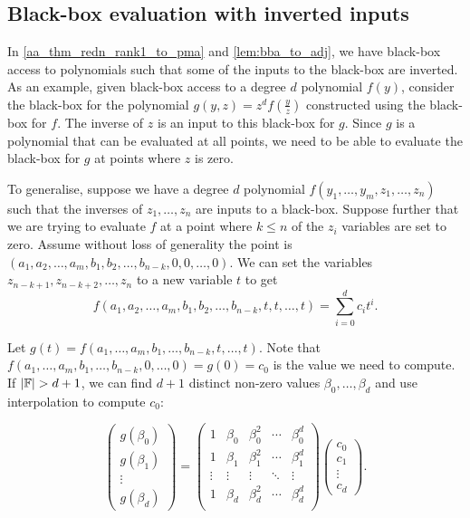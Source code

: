 \documentclass[11pt,letterpaper]{article}
\DeclarePairedDelimiter{\card}{|}{|}
\newcommand{\F}{\mathbb{F}}
\begin{document}
{{{

\subsection{Black-box evaluation with inverted inputs} \label{sec:bb with inverted inputs}

In \cref{aa_thm_redn_rank1_to_pma} and \cref{lem:bba_to_adj}, we have black-box access to polynomials such that some of the inputs to the black-box are inverted. As an example, given black-box access to a degree $d$ polynomial $f(y)$, consider the black-box for the polynomial $g(y,z) = z^d f(\frac{y}{z})$ constructed using the black-box for $f$. The inverse of $z$ is an input to this black-box for $g$. Since $g$ is a polynomial that can be evaluated at all points, we need to be able to evaluate the black-box for $g$ at points where $z$ is zero.

To generalise, suppose we have a degree $d$ polynomial $f(y_1,\dots,y_m,z_1,\dots,z_n)$ such that the inverses of $z_1,\dots,z_n$ are inputs to a black-box. Suppose further that we are trying to evaluate $f$ at a point where $k \leq n$ of the $z_i$ variables are set to zero. Assume without loss of generality the point is $(a_1,a_2,\dots,a_m,b_1,b_2,\dots,b_{n-k},0,0,\dots,0)$. We can set the variables $z_{n-k+1}, z_{n-k+2},\dots,z_n$ to a new variable $t$ to get
\[f(a_1,a_2,\dots,a_m,b_1,b_2,\dots,b_{n-k},t,t,\dots,t) = \sum_{i=0}^{d} c_i t^i\text{.}\]

Let $g(t) = f(a_1,\dots,a_m,b_1,\dots,b_{n-k},t,\dots,t)$. Note that $f(a_1,\dots,a_m,b_1,\dots,b_{n-k},0,\dots,0) = g(0) = c_0$ is the value we need to compute. If $\card{\F} > d+1$, we can find $d+1$ distinct non-zero values $\beta_0,\dots,\beta_{d}$ and use interpolation to compute $c_0$:

\[\begin{pmatrix}g(\beta_0) \\ g(\beta_1) \\ \vdots \\ g(\beta_d)\end{pmatrix} = \begin{pmatrix}
    1 & \beta_0 & \beta_0^2 & \cdots & \beta_0^d \\
    1 & \beta_1 & \beta_1^2 & \cdots & \beta_1^d \\
    \vdots & \vdots & \vdots & \ddots & \vdots \\
    1 & \beta_d & \beta_d^2 & \cdots & \beta_d^d \\
\end{pmatrix}\begin{pmatrix} c_0 \\ c_1 \\ \vdots \\ c_d\end{pmatrix}\text{.}\]

}}}
\end{document}
